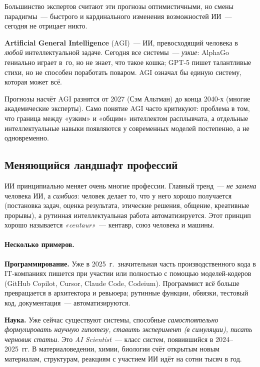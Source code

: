 Большинство экспертов считают эти прогнозы оптимистичными, но смены
парадигмы~--- быстрого и кардинального изменения возможностей ИИ~---
сегодня не отрицает никто.

\begin{notebox}[title={AGI: что это и когда?}]
\textbf{Artificial General Intelligence} (AGI)~--- ИИ, превосходящий
человека в \emph{любой} интеллектуальной задаче. Сегодня все системы~---
\emph{узкие}: AlphaGo гениально играет в~го, но не знает, что такое
кошка; GPT-5 пишет талантливые стихи, но не способен поработать
поваром. AGI означал бы единую систему, которая может всё.

Прогнозы насчёт AGI разнятся от 2027 (Сэм Альтман) до конца 2040-х
(многие академические эксперты). Само понятие AGI часто критикуют:
проблема в том, что граница между «узким» и «общим» интеллектом
расплывчата, а отдельные интеллектуальные навыки появляются у
современных моделей постепенно, а не одновременно.
\end{notebox}

\subsection{Меняющийся ландшафт профессий}
\label{ssec:professions}

ИИ принципиально меняет очень многие профессии. Главный тренд~---
\emph{не замена} человека ИИ, а \emph{симбиоз}: человек делает то,
что у него хорошо получается (постановка задач, оценка результата,
этические решения, общение, креативные прорывы), а рутинная
интеллектуальная работа автоматизируется. Этот принцип хорошо
называется \emph{«centaur»}~--- кентавр, союз человека и
машины.

\paragraph{Несколько примеров.}

\textbf{Программирование.} Уже в 2025~г.\ значительная часть
производственного кода в IT-компаниях пишется при участии или
полностью с помощью моделей-кодеров (GitHub Copilot, Cursor, Claude
Code, Codeium). Программист всё больше превращается в архитектора и
ревьюера; рутинные функции, обвязки, тестовый код, документация~---
автоматизируются.

\textbf{Наука.} Уже сейчас существуют системы, способные
\emph{самостоятельно формулировать научную гипотезу, ставить
эксперимент (в симуляции), писать черновик статьи}. Это
\emph{AI Scientist}~--- класс систем, появившийся в 2024--2025~гг.
В материаловедении, химии, биологии счёт открытым новым материалам,
структурам, реакциям с участием ИИ идёт на сотни тысяч в год.


